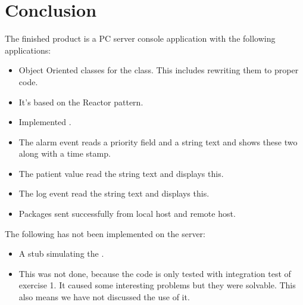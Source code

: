 \documentclass[Main]{subfiles}
\begin{document}
\chapter{Conclusion}

The finished product is a PC server console application with the following applications:

\begin{itemize}
	\item Object Oriented classes for the  class.
	\subitem This includes rewriting them to proper  code.
	\item It's based on the Reactor pattern.
	\item Implemented .
	\item The alarm event reads a priority field and a string text and shows these two along with a time stamp.
	\item The patient value read the string text and displays this.
	\item The log event read the string text and displays this.
	\item Packages sent successfully from local host and remote host.
\end{itemize}
The following has not been implemented on the server:

\begin{itemize}
	\item A stub simulating the . 
	\item[] This was not done, because the code is only tested with integration test of exercise 1. 
	It caused some interesting problems but they were solvable.
	This also means we have not discussed the use of it.
\end{itemize}
\end{document}
